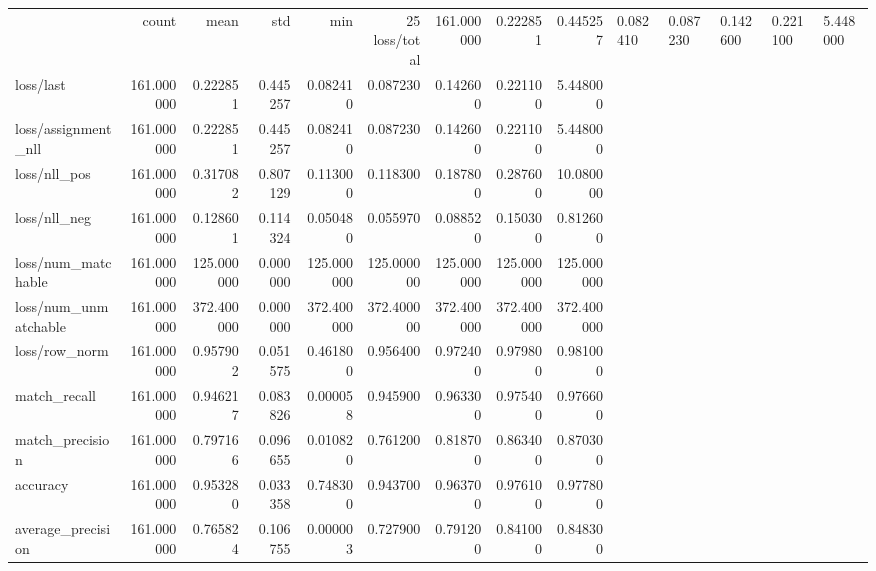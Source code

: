 \begin{tabular}{lrrrrrrrr}
\toprule
 & count & mean & std & min & 25%
\midrule
loss/total & 161.000000 & 0.222851 & 0.445257 & 0.082410 & 0.087230 & 0.142600 & 0.221100 & 5.448000 \\
loss/last & 161.000000 & 0.222851 & 0.445257 & 0.082410 & 0.087230 & 0.142600 & 0.221100 & 5.448000 \\
loss/assignment_nll & 161.000000 & 0.222851 & 0.445257 & 0.082410 & 0.087230 & 0.142600 & 0.221100 & 5.448000 \\
loss/nll_pos & 161.000000 & 0.317082 & 0.807129 & 0.113000 & 0.118300 & 0.187800 & 0.287600 & 10.080000 \\
loss/nll_neg & 161.000000 & 0.128601 & 0.114324 & 0.050480 & 0.055970 & 0.088520 & 0.150300 & 0.812600 \\
loss/num_matchable & 161.000000 & 125.000000 & 0.000000 & 125.000000 & 125.000000 & 125.000000 & 125.000000 & 125.000000 \\
loss/num_unmatchable & 161.000000 & 372.400000 & 0.000000 & 372.400000 & 372.400000 & 372.400000 & 372.400000 & 372.400000 \\
loss/row_norm & 161.000000 & 0.957902 & 0.051575 & 0.461800 & 0.956400 & 0.972400 & 0.979800 & 0.981000 \\
match_recall & 161.000000 & 0.946217 & 0.083826 & 0.000058 & 0.945900 & 0.963300 & 0.975400 & 0.976600 \\
match_precision & 161.000000 & 0.797166 & 0.096655 & 0.010820 & 0.761200 & 0.818700 & 0.863400 & 0.870300 \\
accuracy & 161.000000 & 0.953280 & 0.033358 & 0.748300 & 0.943700 & 0.963700 & 0.976100 & 0.977800 \\
average_precision & 161.000000 & 0.765824 & 0.106755 & 0.000003 & 0.727900 & 0.791200 & 0.841000 & 0.848300 \\
\bottomrule
\end{tabular}
